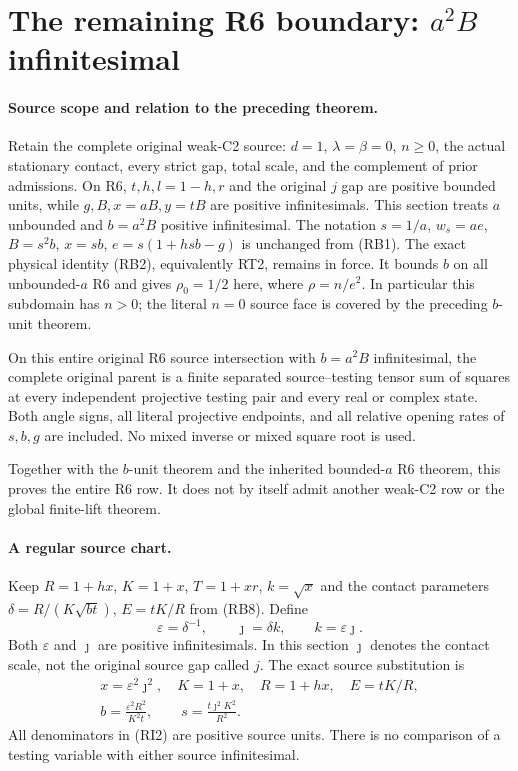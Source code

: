 \section{The remaining R6 boundary: $a^2B$ infinitesimal}
\label{sec:r6-b-inf}

\paragraph{Source scope and relation to the preceding theorem.}
Retain the complete original weak-C2 source: $d=1$, $\lambda=\beta=0$,
$n\geq0$, the actual stationary contact, every strict gap, total scale,
and the complement of prior admissions. On R6, $t,h,l=1-h,r$ and
the original $j$ gap are positive bounded units, while $g,B,x=aB,y=tB$
are positive infinitesimals. This section treats $a$ unbounded and
$b=a^2B$ positive infinitesimal. The notation $s=1/a$, $w_s=ae$,
$B=s^2b$, $x=sb$, $e=s(1+hsb-g)$ is unchanged from (RB1).
The exact physical identity (RB2), equivalently RT2, remains in force.
It bounds $b$ on all unbounded-$a$ R6 and gives $\rho_0=1/2$ here,
where $\rho=n/e^2$. In particular this subdomain has $n>0$; the
literal $n=0$ source face is covered by the preceding $b$-unit theorem.

\begin{theorem}
On this entire original R6 source intersection with $b=a^2B$
infinitesimal, the complete original parent is a finite separated
source--testing tensor sum of squares at every independent projective
testing pair and every real or complex state. Both angle signs, all
literal projective endpoints, and all relative opening rates of
$s,b,g$ are included. No mixed inverse or mixed square root is used.
\end{theorem}

Together with the $b$-unit theorem and the inherited bounded-$a$
R6 theorem, this proves the entire R6 row. It does not by itself
admit another weak-C2 row or the global finite-lift theorem.

\paragraph{A regular source chart.}
Keep $R=1+hx$, $K=1+x$, $T=1+xr$, $k=\sqrt{x}$ and the contact
parameters $\delta=R/(K\sqrt{bt})$, $E=tK/R$ from (RB8). Define
\[
 \varepsilon=\delta^{-1},\qquad \jmath=\delta k,
 \qquad k=\varepsilon\jmath.
 \tag{RI1}
\]
Both $\varepsilon$ and $\jmath$ are positive infinitesimals. In this
section $\jmath$ denotes the contact scale, not the original source
gap called $j$. The exact source substitution is
\[
 \begin{gathered}
 x=\varepsilon^2\jmath^2,\quad K=1+x,\quad R=1+hx,\quad
 E=tK/R,\\
 b=\frac{\varepsilon^2R^2}{K^2t},\qquad
 s=\frac{t\jmath^2K^2}{R^2}.
 \end{gathered}                                                   \tag{RI2}
\]
All denominators in (RI2) are positive source units. There is no
comparison of a testing variable with either source infinitesimal.

